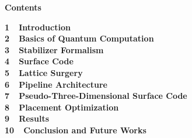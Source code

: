 \documentclass[a4paper,11pt]{ltjsarticle}
\begin{document}
\huge\bfseries{Contents}

\vspace{10pt}
\Large\bfseries{
1\ \ Introduction\\
2\ \ Basics of Quantum Computation\\
3\ \ Stabilizer Formalism\\
4\ \ Surface Code\\
5\ \ Lattice Surgery\\
6\ \ Pipeline Architecture\\
7\ \ Pseudo-Three-Dimensional Surface Code\\
8\ \ Placement Optimization\\
9\ \ Results\\
10\ \ Conclusion and Future Works\\
}
\end{document}
